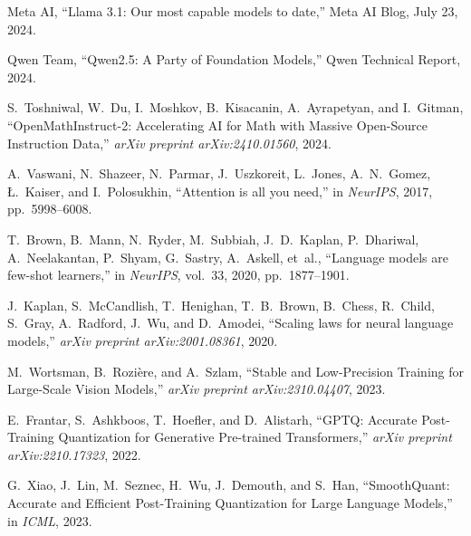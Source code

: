 \documentclass[conference]{IEEEtran}
\begin{document}
\begin{thebibliography}{40}
Meta AI,
``Llama 3.1: Our most capable models to date,''
Meta AI Blog, July 23, 2024.

Qwen Team,
``Qwen2.5: A Party of Foundation Models,''
Qwen Technical Report, 2024.

S.~Toshniwal, W.~Du, I.~Moshkov, B.~Kisacanin, A.~Ayrapetyan, and I.~Gitman, 
``OpenMathInstruct-2: Accelerating AI for Math with Massive Open-Source Instruction Data,'' 
\emph{arXiv preprint arXiv:2410.01560}, 2024.

A.~Vaswani, N.~Shazeer, N.~Parmar, J.~Uszkoreit, L.~Jones, A.~N.~Gomez, {\L}.~Kaiser, and I.~Polosukhin,
``Attention is all you need,''
in \emph{NeurIPS}, 2017, pp.~5998--6008.

T.~Brown, B.~Mann, N.~Ryder, M.~Subbiah, J.~D.~Kaplan, P.~Dhariwal, A.~Neelakantan, P.~Shyam, G.~Sastry, A.~Askell, et~al.,
``Language models are few-shot learners,''
in \emph{NeurIPS}, vol.~33, 2020, pp.~1877--1901.

J.~Kaplan, S.~McCandlish, T.~Henighan, T.~B.~Brown, B.~Chess, R.~Child, S.~Gray, A.~Radford, J.~Wu, and D.~Amodei,
``Scaling laws for neural language models,''
\emph{arXiv preprint arXiv:2001.08361}, 2020.

M.~Wortsman, B.~Rozière, and A.~Szlam,
``Stable and Low-Precision Training for Large-Scale Vision Models,''
\emph{arXiv preprint arXiv:2310.04407}, 2023.

E.~Frantar, S.~Ashkboos, T.~Hoefler, and D.~Alistarh,
``GPTQ: Accurate Post-Training Quantization for Generative Pre-trained Transformers,''
\emph{arXiv preprint arXiv:2210.17323}, 2022.

G.~Xiao, J.~Lin, M.~Seznec, H.~Wu, J.~Demouth, and S.~Han,
``SmoothQuant: Accurate and Efficient Post-Training Quantization for Large Language Models,''
in \emph{ICML}, 2023.
\end{thebibliography}
\end{document}
